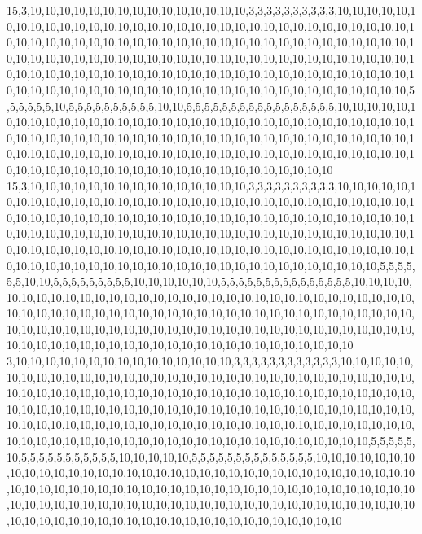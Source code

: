 15,3,10,10,10,10,10,10,10,10,10,10,10,10,10,10,10,3,3,3,3,3,3,3,3,3,3,10,10,10,10,10,10,10,10,10,10,10,10,10,10,10,10,10,10,10,10,10,10,10,10,10,10,10,10,10,10,10,10,10,10,10,10,10,10,10,10,10,10,10,10,10,10,10,10,10,10,10,10,10,10,10,10,10,10,10,10,10,10,10,10,10,10,10,10,10,10,10,10,10,10,10,10,10,10,10,10,10,10,10,10,10,10,10,10,10,10,10,10,10,10,10,10,10,10,10,10,10,10,10,10,10,10,10,10,10,10,10,10,10,10,10,10,10,10,10,10,10,10,10,10,10,10,10,10,10,10,10,10,10,10,10,10,10,10,10,10,10,10,10,10,10,5,5,5,5,5,5,10,5,5,5,5,5,5,5,5,5,5,10,10,5,5,5,5,5,5,5,5,5,5,5,5,5,5,5,5,5,10,10,10,10,10,10,10,10,10,10,10,10,10,10,10,10,10,10,10,10,10,10,10,10,10,10,10,10,10,10,10,10,10,10,10,10,10,10,10,10,10,10,10,10,10,10,10,10,10,10,10,10,10,10,10,10,10,10,10,10,10,10,10,10,10,10,10,10,10,10,10,10,10,10,10,10,10,10,10,10,10,10,10,10,10,10,10,10,10,10,10,10,10,10,10,10,10,10,10,10,10,10,10,10,10,10,10,10,10,10,10,10
15,3,10,10,10,10,10,10,10,10,10,10,10,10,10,10,10,3,3,3,3,3,3,3,3,3,3,10,10,10,10,10,10,10,10,10,10,10,10,10,10,10,10,10,10,10,10,10,10,10,10,10,10,10,10,10,10,10,10,10,10,10,10,10,10,10,10,10,10,10,10,10,10,10,10,10,10,10,10,10,10,10,10,10,10,10,10,10,10,10,10,10,10,10,10,10,10,10,10,10,10,10,10,10,10,10,10,10,10,10,10,10,10,10,10,10,10,10,10,10,10,10,10,10,10,10,10,10,10,10,10,10,10,10,10,10,10,10,10,10,10,10,10,10,10,10,10,10,10,10,10,10,10,10,10,10,10,10,10,10,10,10,10,10,10,10,10,10,10,10,5,5,5,5,5,5,10,10,5,5,5,5,5,5,5,5,5,10,10,10,10,10,10,5,5,5,5,5,5,5,5,5,5,5,5,5,5,5,10,10,10,10,10,10,10,10,10,10,10,10,10,10,10,10,10,10,10,10,10,10,10,10,10,10,10,10,10,10,10,10,10,10,10,10,10,10,10,10,10,10,10,10,10,10,10,10,10,10,10,10,10,10,10,10,10,10,10,10,10,10,10,10,10,10,10,10,10,10,10,10,10,10,10,10,10,10,10,10,10,10,10,10,10,10,10,10,10,10,10,10,10,10,10,10,10,10,10,10,10,10,10,10,10,10,10,10,10,10,10,10
3,10,10,10,10,10,10,10,10,10,10,10,10,10,10,10,3,3,3,3,3,3,3,3,3,3,3,3,10,10,10,10,10,10,10,10,10,10,10,10,10,10,10,10,10,10,10,10,10,10,10,10,10,10,10,10,10,10,10,10,10,10,10,10,10,10,10,10,10,10,10,10,10,10,10,10,10,10,10,10,10,10,10,10,10,10,10,10,10,10,10,10,10,10,10,10,10,10,10,10,10,10,10,10,10,10,10,10,10,10,10,10,10,10,10,10,10,10,10,10,10,10,10,10,10,10,10,10,10,10,10,10,10,10,10,10,10,10,10,10,10,10,10,10,10,10,10,10,10,10,10,10,10,10,10,10,10,10,10,10,10,10,10,10,10,10,10,10,10,10,5,5,5,5,5,10,5,5,5,5,5,5,5,5,5,5,5,10,10,10,10,10,5,5,5,5,5,5,5,5,5,5,5,5,5,5,10,10,10,10,10,10,10,10,10,10,10,10,10,10,10,10,10,10,10,10,10,10,10,10,10,10,10,10,10,10,10,10,10,10,10,10,10,10,10,10,10,10,10,10,10,10,10,10,10,10,10,10,10,10,10,10,10,10,10,10,10,10,10,10,10,10,10,10,10,10,10,10,10,10,10,10,10,10,10,10,10,10,10,10,10,10,10,10,10,10,10,10,10,10,10,10,10,10,10,10,10,10,10,10,10,10,10,10,10,10,10,10,10,10
